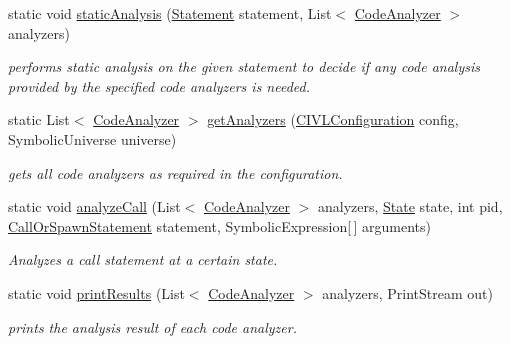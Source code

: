 \begin{DoxyCompactItemize}
\item 
static void \hyperlink{classedu_1_1udel_1_1cis_1_1vsl_1_1civl_1_1analysis_1_1IF_1_1Analysis_abc16319e3212abe9652642d393a28e06}{static\+Analysis} (\hyperlink{interfaceedu_1_1udel_1_1cis_1_1vsl_1_1civl_1_1model_1_1IF_1_1statement_1_1Statement}{Statement} statement, List$<$ \hyperlink{interfaceedu_1_1udel_1_1cis_1_1vsl_1_1civl_1_1analysis_1_1IF_1_1CodeAnalyzer}{Code\+Analyzer} $>$ analyzers)
\begin{DoxyCompactList}\small\item\em performs static analysis on the given statement to decide if any code analysis provided by the specified code analyzers is needed. \end{DoxyCompactList}\item 
static List$<$ \hyperlink{interfaceedu_1_1udel_1_1cis_1_1vsl_1_1civl_1_1analysis_1_1IF_1_1CodeAnalyzer}{Code\+Analyzer} $>$ \hyperlink{classedu_1_1udel_1_1cis_1_1vsl_1_1civl_1_1analysis_1_1IF_1_1Analysis_ade4bb6b114e04d92293c7c8934068135}{get\+Analyzers} (\hyperlink{classedu_1_1udel_1_1cis_1_1vsl_1_1civl_1_1config_1_1IF_1_1CIVLConfiguration}{C\+I\+V\+L\+Configuration} config, Symbolic\+Universe universe)
\begin{DoxyCompactList}\small\item\em gets all code analyzers as required in the configuration. \end{DoxyCompactList}\item 
static void \hyperlink{classedu_1_1udel_1_1cis_1_1vsl_1_1civl_1_1analysis_1_1IF_1_1Analysis_a870f196b1f0a5de545cc550c2601706b}{analyze\+Call} (List$<$ \hyperlink{interfaceedu_1_1udel_1_1cis_1_1vsl_1_1civl_1_1analysis_1_1IF_1_1CodeAnalyzer}{Code\+Analyzer} $>$ analyzers, \hyperlink{interfaceedu_1_1udel_1_1cis_1_1vsl_1_1civl_1_1state_1_1IF_1_1State}{State} state, int pid, \hyperlink{interfaceedu_1_1udel_1_1cis_1_1vsl_1_1civl_1_1model_1_1IF_1_1statement_1_1CallOrSpawnStatement}{Call\+Or\+Spawn\+Statement} statement, Symbolic\+Expression\mbox{[}$\,$\mbox{]} arguments)
\begin{DoxyCompactList}\small\item\em Analyzes a call statement at a certain state. \end{DoxyCompactList}\item 
static void \hyperlink{classedu_1_1udel_1_1cis_1_1vsl_1_1civl_1_1analysis_1_1IF_1_1Analysis_afc72487a27f280e5de05002d6483a153}{print\+Results} (List$<$ \hyperlink{interfaceedu_1_1udel_1_1cis_1_1vsl_1_1civl_1_1analysis_1_1IF_1_1CodeAnalyzer}{Code\+Analyzer} $>$ analyzers, Print\+Stream out)
\begin{DoxyCompactList}\small\item\em prints the analysis result of each code analyzer. \end{DoxyCompactList}\end{DoxyCompactItemize}
